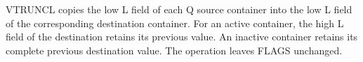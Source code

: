 VTRUNCL copies the low L field of each Q source container into the low L field of
the corresponding destination container.  For an active container, the high L
field of the destination retains its previous value.  An inactive container
retains its complete previous destination value.  The operation leaves FLAGS
unchanged.
